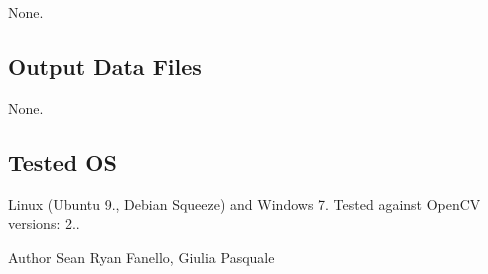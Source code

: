 None.\hypertarget{group__SFM_out_data_sec}{}\subsection{Output Data Files}\label{group__SFM_out_data_sec}
None.\hypertarget{group__SFM_tested_os_sec}{}\subsection{Tested O\+S}\label{group__SFM_tested_os_sec}
Linux (Ubuntu 9., Debian Squeeze) and Windows 7. Tested against Open\+C\+V versions\+: 2..

\begin{DoxyAuthor}{Author}
Sean Ryan Fanello, Giulia Pasquale 
\end{DoxyAuthor}
